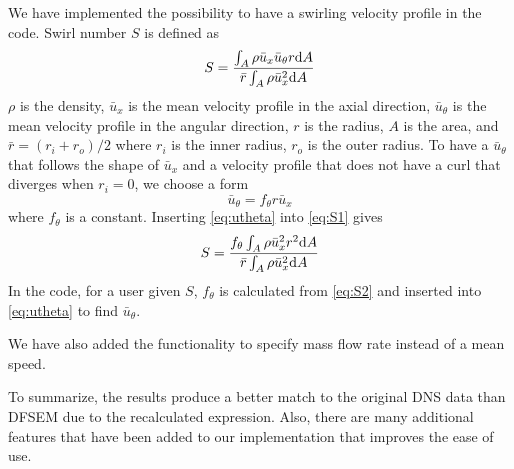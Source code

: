 \documentclass[
 amsmath,amssymb,
 aps,
]{revtex4-2}
\newcommand{\dd}{\ensuremath\mathrm{d}}
\begin{document}
We have implemented the possibility to have a swirling velocity profile in the code. 
Swirl number $S$ is defined as
\begin{equation}
\label{eq:S1}
  S = \frac{\int_{A} \rho \bar u_x \bar u_\theta r \dd A}{\bar r \int_{A} \rho \bar u^2_x \dd A}
\end{equation}
$\rho$ is the density, $ \bar u_x$ is the mean velocity profile in the axial direction, $\bar u_\theta$ is the mean velocity profile in the angular direction, $r$ is the radius, $A$ is the area, and $\bar r = (r_i+r_o)/ 2$ where $r_i$ is the inner radius, $r_o$ is the outer radius. 
To have a $\bar u_\theta$ that follows the shape of $\bar u_x$ and a velocity profile that does not have a curl that diverges when $r_i = 0$, we choose a form 
\begin{equation}
\label{eq:utheta}
  \bar u_\theta = f_\theta r \bar u_x 
\end{equation}
where $f_\theta$ is a constant.
Inserting \cref{eq:utheta} into \cref{eq:S1} gives
\begin{equation}
  \label{eq:S2}
  S = \frac{ f_\theta\int_{A} \rho \bar u_x^2 r^2 \dd A}{\bar r \int_{A} \rho \bar u^2_x \dd A}
\end{equation}
In the code, for a user given $S$, $f_\theta$ is calculated from \cref{eq:S2} and inserted into \cref{eq:utheta} to find $\bar u_\theta$. 


We have also added the functionality to specify mass flow rate instead of a mean speed.

To summarize, the results produce a better match to the original DNS data than DFSEM due to the recalculated expression.
Also, there are many additional features that have been added to our implementation that improves the ease of use. 
\end{document}

